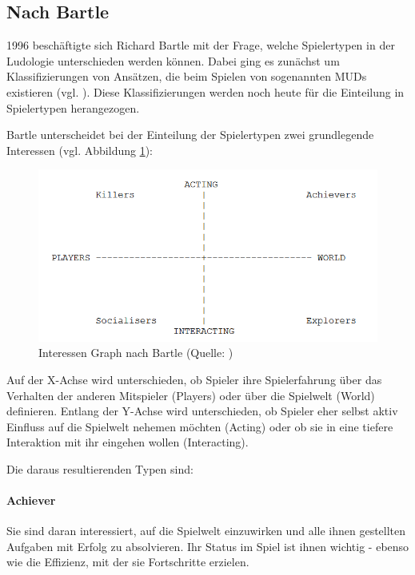 \subsection{Nach Bartle}
1996 beschäftigte sich Richard Bartle mit der Frage, welche Spielertypen in der Ludologie unterschieden werden können. Dabei ging es zunächst um Klassifizierungen von Ansätzen, die beim Spielen von sogenannten \ac{MUD}s existieren (vgl. \cite{bartle_hearts_1996}). Diese Klassifizierungen werden noch heute für die Einteilung in Spielertypen herangezogen.

Bartle unterscheidet bei der Einteilung der Spielertypen zwei grundlegende Interessen (vgl. Abbildung \ref{fig:bartle-muds}):

\begin{figure}[ht]
\centering
\includegraphics[width=1\linewidth]{content/pictures/basic_interests.PNG}
\caption{Interessen Graph nach Bartle (Quelle: \cite{bartle_hearts_1996})}
\label{fig:bartle-muds}
\end{figure}

Auf der X-Achse wird unterschieden, ob Spieler ihre Spielerfahrung über das Verhalten der anderen Mitspieler (Players) oder über die Spielwelt (World) definieren. Entlang der Y-Achse wird unterschieden, ob Spieler eher selbst aktiv Einfluss auf die Spielwelt nehemen möchten (Acting) oder ob sie in eine tiefere Interaktion mit ihr eingehen wollen (Interacting).

Die daraus resultierenden Typen sind:
\paragraph{Achiever}
Sie sind daran interessiert, auf die Spielwelt einzuwirken und alle ihnen gestellten Aufgaben mit Erfolg zu absolvieren. Ihr Status im Spiel ist ihnen wichtig - ebenso wie die Effizienz, mit der sie Fortschritte erzielen.

